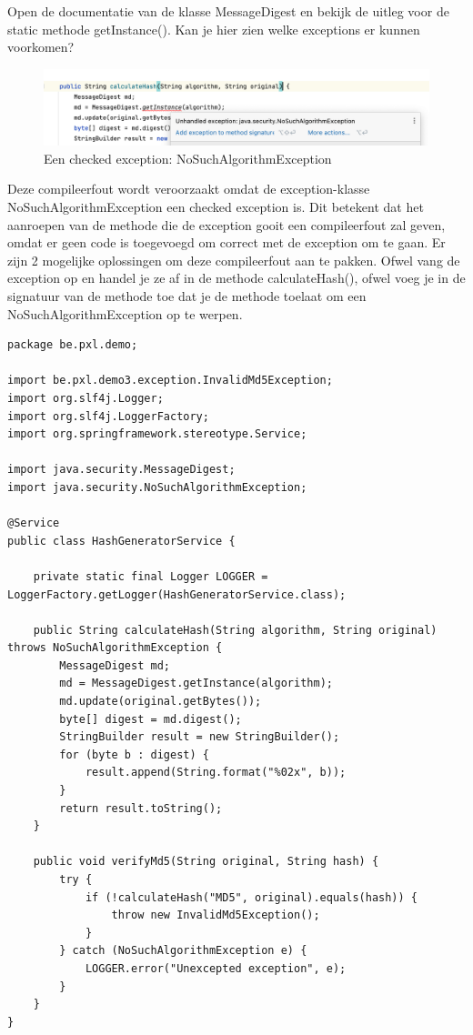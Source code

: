\begin{oefening}
Open de documentatie van de klasse MessageDigest en bekijk de uitleg voor de static methode getInstance(). Kan je hier zien welke exceptions er kunnen voorkomen?
\end{oefening}

\begin{figure}[H]
\includegraphics[width=\linewidth]{images/h2/no_such_algorithm_exception.png}
\caption{Een checked exception: NoSuchAlgorithmException}
\label{fig:no_such_algorithm}
\end{figure}

Deze compileerfout wordt veroorzaakt omdat de exception-klasse NoSuchAlgorithmException een checked exception is. Dit betekent dat het aanroepen van de methode die de exception gooit een compileerfout zal geven, omdat er geen code is toegevoegd om correct met de  exception om te gaan.
Er zijn 2 mogelijke oplossingen om deze compileerfout aan te pakken. Ofwel vang de exception op en handel je ze af in de methode calculateHash(), ofwel voeg je in de signatuur van de methode toe dat je de methode toelaat om een NoSuchAlgorithmException op te werpen. 

\begin{lstlisting}
package be.pxl.demo;

import be.pxl.demo3.exception.InvalidMd5Exception;
import org.slf4j.Logger;
import org.slf4j.LoggerFactory;
import org.springframework.stereotype.Service;

import java.security.MessageDigest;
import java.security.NoSuchAlgorithmException;

@Service
public class HashGeneratorService {

	private static final Logger LOGGER = LoggerFactory.getLogger(HashGeneratorService.class);

	public String calculateHash(String algorithm, String original) throws NoSuchAlgorithmException {
		MessageDigest md;
		md = MessageDigest.getInstance(algorithm);
		md.update(original.getBytes());
		byte[] digest = md.digest();
		StringBuilder result = new StringBuilder();
		for (byte b : digest) {
			result.append(String.format("%02x", b));
		}
		return result.toString();
	}

	public void verifyMd5(String original, String hash) {
		try {
			if (!calculateHash("MD5", original).equals(hash)) {
				throw new InvalidMd5Exception();
			}
		} catch (NoSuchAlgorithmException e) {
			LOGGER.error("Unexcepted exception", e);
		}
	}
}
\end{lstlisting}

